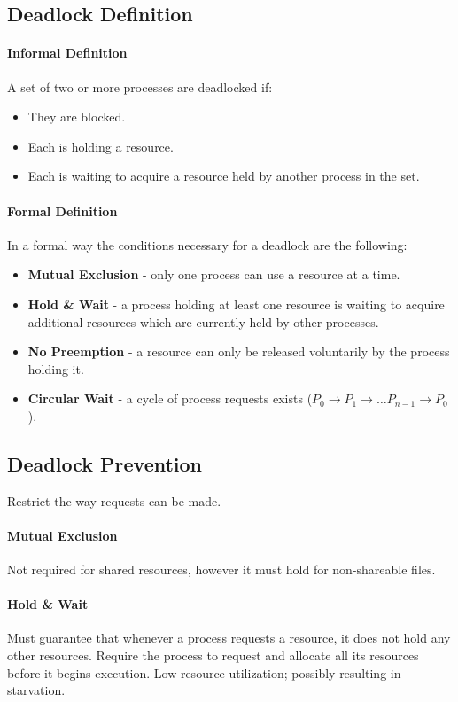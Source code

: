 \subsection{Deadlock Definition}
\paragraph{Informal Definition}
A set of two or more processes are deadlocked if:
\begin{itemize}
    \item They are blocked.
    \item Each is holding a resource.
    \item Each is waiting to acquire a resource held by another process in the set.
\end{itemize}
\paragraph{Formal Definition}
In a formal way the conditions necessary for a deadlock are the following:
\begin{itemize}
    \item \textbf{Mutual Exclusion} - only one process can use a resource at a time.
    \item \textbf{Hold \& Wait} - a process holding at least one resource is waiting to acquire additional resources which are currently held by other processes.
    \item \textbf{No Preemption} - a resource can only be released voluntarily by the process holding it.
    \item \textbf{Circular Wait} - a cycle of process requests exists ($P_0 \rightarrow P_1 \rightarrow \dots P_{n-1} \rightarrow P_0$).
\end{itemize}

\subsection{Deadlock Prevention}
Restrict the way requests can be made.

\paragraph{Mutual Exclusion}
Not required for shared resources, however it must hold for non-shareable files.

\paragraph{Hold \& Wait}
Must guarantee that whenever a process requests a resource, it does not hold any other resources.
Require the process to request and allocate all its resources before it begins execution.
Low resource utilization; possibly resulting in starvation.

